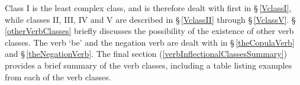 Class I is the least complex class, %
and is therefore dealt with first in §\,\ref{VclassI}, %
while classes II, III, IV and V are described in §\,\ref{VclassII} %
through §\,\ref{VclassV}. %
§\,\ref{otherVerbClasses} briefly discusses the possibility of the existence of other verb classes. The verb  ‘be’ and the negation verb are dealt with in §\,\ref{theCopulaVerb} and §\,\ref{theNegationVerb}. The final section (\ref{verbInflectionalClassesSummary}) provides a brief summary of the verb classes, including a table listing examples from each of the verb classes. 


